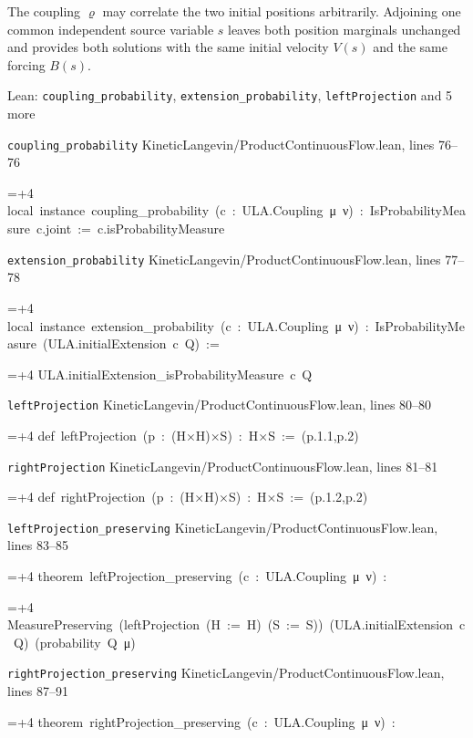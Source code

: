 \documentclass[11pt,a4paper]{article}
\newlength{\leancharwidth}
\newenvironment{leancode}{\par\smallskip\begingroup\ttfamily\footnotesize\raggedright
  \settowidth{\leancharwidth}{M}\setlength{\parskip}{0pt}\setlength{\parindent}{0pt}
  \frenchspacing}{\par\endgroup\smallskip}
\newcommand{\leanline}[2]{\hangindent=\dimexpr#1\leancharwidth+4\leancharwidth\relax
  \hangafter=1\noindent\hspace*{#1\leancharwidth}#2\par}
\newcommand{\leansource}[1]{\par{\footnotesize\color{leanmuted}#1}\par}
\begin{document}
The coupling \(\varrho\) may correlate the two initial positions arbitrarily. Adjoining one common independent source variable \(s\) leaves both position marginals unchanged and provides both solutions with the same initial velocity \(V(s)\) and the same forcing \(B(s)\).

\begin{leanbox}{Lean: \texttt{coupling\_\allowbreak{}probability}, \texttt{extension\_\allowbreak{}probability}, \texttt{leftProjection} and 5 more}
\leansource{\texttt{coupling\_\allowbreak{}probability} \quad KineticLangevin/\allowbreak{}ProductContinuousFlow.lean, lines 76–76}
\begin{leancode}
\leanline{0}{local\ instance\ coupling\_probability\ (c\ :\ ULA.Coupling\ μ\ ν)\ :\ IsProbabilityMeasure\ c.joint\ :=\ c.isProbabilityMeasure}
\end{leancode}
\leansource{\texttt{extension\_\allowbreak{}probability} \quad KineticLangevin/\allowbreak{}ProductContinuousFlow.lean, lines 77–78}
\begin{leancode}
\leanline{0}{local\ instance\ extension\_probability\ (c\ :\ ULA.Coupling\ μ\ ν)\ :\ IsProbabilityMeasure\ (ULA.initialExtension\ c\ Q)\ :=}
\leanline{2}{ULA.initialExtension\_isProbabilityMeasure\ c\ Q}
\end{leancode}
\leansource{\texttt{leftProjection} \quad KineticLangevin/\allowbreak{}ProductContinuousFlow.lean, lines 80–80}
\begin{leancode}
\leanline{0}{def\ leftProjection\ (p\ :\ (H×H)×S)\ :\ H×S\ :=\ (p.1.1,p.2)}
\end{leancode}
\leansource{\texttt{rightProjection} \quad KineticLangevin/\allowbreak{}ProductContinuousFlow.lean, lines 81–81}
\begin{leancode}
\leanline{0}{def\ rightProjection\ (p\ :\ (H×H)×S)\ :\ H×S\ :=\ (p.1.2,p.2)}
\end{leancode}
\leansource{\texttt{leftProjection\_\allowbreak{}preserving} \quad KineticLangevin/\allowbreak{}ProductContinuousFlow.lean, lines 83–85}
\begin{leancode}
\leanline{0}{theorem\ leftProjection\_preserving\ (c\ :\ ULA.Coupling\ μ\ ν)\ :}
\leanline{4}{MeasurePreserving\ (leftProjection\ (H\ :=\ H)\ (S\ :=\ S))\ (ULA.initialExtension\ c\ Q)\ (probability\ Q\ μ)}
\end{leancode}
\leansource{\texttt{rightProjection\_\allowbreak{}preserving} \quad KineticLangevin/\allowbreak{}ProductContinuousFlow.lean, lines 87–91}
\begin{leancode}
\leanline{0}{theorem\ rightProjection\_preserving\ (c\ :\ ULA.Coupling\ μ\ ν)\ :}

\end{leancode}
\end{leanbox}
\end{document}
